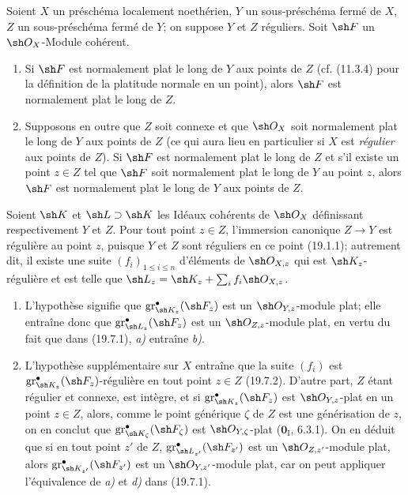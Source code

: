 \begin{corollary}[19.7.5]
\label{IV.19.7.5}
Soient $X$ un préschéma localement noethérien, $Y$ un sous-préschéma fermé de $X$, $Z$ un sous-préschéma fermé de $Y$; on suppose $Y$ et $Z$ réguliers. Soit $\sh F$ un $\sh O_X$-Module cohérent.
\begin{enumerate}
  \item[\textup{(i)}] Si $\sh F$ est normalement plat le long de $Y$ aux points de $Z$ \textup{(cf. (11.3.4) pour la définition de la platitude normale en un point)}, alors $\sh F$ est normalement plat le long de $Z$.
  \item[\textup{(ii)}] Supposons en outre que $Z$ soit connexe et que $\sh O_X$ soit normalement plat le long de $Y$ aux points de $Z$ \textup{(ce qui aura lieu en particulier si $X$ est \emph{régulier} aux points de $Z$)}. Si $\sh F$ est normalement plat le long de $Z$ et s'il existe \textup{un} point $z\in Z$ tel que $\sh F$ soit normalement plat le long de $Y$ au point $z$, alors $\sh F$ est normalement plat le long de $Y$ aux points de $Z$.
\end{enumerate}
\end{corollary}

Soient $\sh K$ et $\sh L\supset\sh K$ les Idéaux cohérents de $\sh O_X$ définissant respectivement $Y$ et $Z$. Pour tout point $z\in Z$, l'immersion canonique $Z\to Y$ est régulière au point $z$, puisque $Y$ et $Z$ sont réguliers en ce point (19.1.1); autrement dit, il existe une suite $(f_i)_{1\leq i\leq n}$ d'éléments de $\sh O_{X,z}$ qui est $\sh K_z$-régulière et est telle que $\sh L_z=\sh K_z+\sum_i f_i\sh O_{X,z}$.
\begin{enumerate}
  \item[(i)] L'hypothèse signifie que $\operatorname{gr}_{\sh K_z}^\bullet(\sh F_z)$ est un $\sh O_{Y,z}$-module plat; elle entraîne donc que $\operatorname{gr}_{\sh L_z}^\bullet(\sh F_z)$ est un $\sh O_{Z,z}$-module plat, en vertu du fait que dans (19.7.1), \emph{a)} entraîne \emph{b)}.
  \item[(ii)] L'hypothèse supplémentaire sur $X$ entraîne que la suite $(f_i)$ est $\operatorname{gr}_{\sh K_z}^\bullet(\sh F_z)$-régulière en tout point $z\in Z$ (19.7.2). D'autre part, $Z$ étant régulier et connexe, est intègre, et si $\operatorname{gr}_{\sh K_z}^\bullet(\sh F_z)$ est $\sh O_{Y,z}$-plat en un point $z\in Z$, alors, comme le point générique $\zeta$ de $Z$ est une générisation de $z$, on en conclut que $\operatorname{gr}_{\sh K_\zeta}^\bullet(\sh F_\zeta)$ est $\sh O_{Y,\zeta}$-plat ($\mathbf{0}_{\mathrm I}$, 6.3.1). On en déduit que si en tout point $z'$ de $Z$, $\operatorname{gr}_{\sh L_{z'}}^\bullet(\sh F_{z'})$ est un $\sh O_{Z,z'}$-module plat, alors $\operatorname{gr}_{\sh K_{z'}}^\bullet(\sh F_{z'})$ est un $\sh O_{Y,z'}$-module plat, car on peut appliquer l'équivalence de \emph{a)} et \emph{d)} dans (19.7.1).
\end{enumerate}

